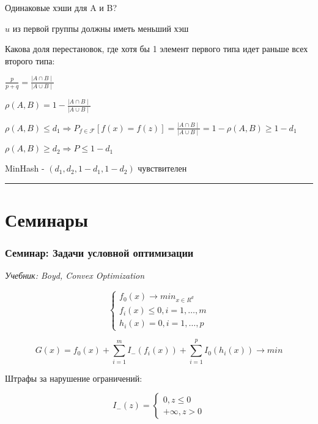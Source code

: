 \documentclass[a4paper, 12pt]{article}
\begin{document}
\begin{enumerate}
\begin{enumerate}
\begin{enumerate}
            Одинаковые хэши для A и B?

            $u$ из первой группы должны иметь меньший хэш

            Какова доля перестановок, где хотя бы 1 элемент
            первого типа идет раньше всех второго типа:

            $\frac{p}{p + q} = 
            \frac{\mid A \cap B \mid}{\mid A \cup B \mid}$

            $\rho(A, B) = 1 - \frac{\mid A \cap B \mid}
            {\mid A \cup B \mid}$

            $\rho(A, B) \leq d_1 \Rightarrow 
            P_{f \in \mathcal{F}}[f(x) = f(z)] =  \frac{\mid A \cap B \mid}
            {\mid A \cup B \mid} = 1 - \rho(A, B) \geq 1 - d_1$

            $\rho(A, B) \geq d_2 \Rightarrow P \leq 1 - d_1$

            MinHash - $(d_1, d_2, 1 - d_1, 1 - d_2)$ чувствителен
            
            \rule{\linewidth}{0.5pt}
        \end{enumerate}
    \end{enumerate}
\end{enumerate}
\pagebreak

\part{Семинары}
\section{Семинар: Задачи условной оптимизации}

\textit{Учебник: Boyd, Convex Optimization}

\[\begin{cases}
    f_0(x) \rightarrow min_{x \in R^d} \\
    f_i(x) \leq 0, i = 1, \ldots, m \\
    h_i(x) = 0, i = 1, \ldots, p
\end{cases}\]

\[G(x) = f_0(x) + \sum_{i = 1}^m I_{-}(f_i(x)) + \sum_{i = 1}^p I_0(h_i(x)) \rightarrow min\]

Штрафы за нарушение ограничений:

\[I_{-}(z) = \begin{cases}
    0, z \leq 0 \\
    + \infty, z > 0 
\end{cases}\]
\end{document}
